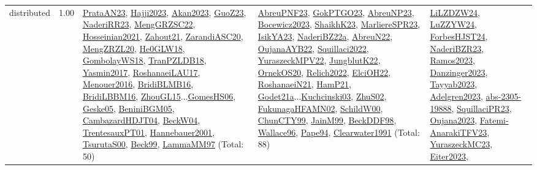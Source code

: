 {\begin{longtable}{p{3cm}r>{\raggedright\arraybackslash}p{6cm}>{\raggedright\arraybackslash}p{6cm}>{\raggedright\arraybackslash}p{8cm}}
\index{distributed}\index{Concepts!distributed}distributed &  1.00 & \hyperref[detail:PrataAN23]{PrataAN23}, \hyperref[detail:Hajji2023]{Hajji2023}, \hyperref[detail:Akan2023]{Akan2023}, \hyperref[detail:GuoZ23]{GuoZ23}, \hyperref[detail:NaderiRR23]{NaderiRR23}, \hyperref[detail:MengGRZSC22]{MengGRZSC22}, \hyperref[detail:Hosseinian2021]{Hosseinian2021}, \hyperref[detail:Zahout21]{Zahout21}, \hyperref[detail:ZarandiASC20]{ZarandiASC20}, \hyperref[detail:MengZRZL20]{MengZRZL20}, \hyperref[detail:He0GLW18]{He0GLW18}, \hyperref[detail:GombolayWS18]{GombolayWS18}, \hyperref[detail:TranPZLDB18]{TranPZLDB18}, \hyperref[detail:Yasmin2017]{Yasmin2017}, \hyperref[detail:RoshanaeiLAU17]{RoshanaeiLAU17}, \hyperref[detail:Menouer2016]{Menouer2016}, \hyperref[detail:BridiBLMB16]{BridiBLMB16}, \hyperref[detail:BridiLBBM16]{BridiLBBM16}, \hyperref[detail:ZhouGL15]{ZhouGL15}...\hyperref[detail:GomesHS06]{GomesHS06}, \hyperref[detail:Geske05]{Geske05}, \hyperref[detail:BeniniBGM05]{BeniniBGM05}, \hyperref[detail:CambazardHDJT04]{CambazardHDJT04}, \hyperref[detail:BeckW04]{BeckW04}, \hyperref[detail:TrentesauxPT01]{TrentesauxPT01}, \hyperref[detail:Hannebauer2001]{Hannebauer2001}, \hyperref[detail:TsurutaS00]{TsurutaS00}, \hyperref[detail:Beck99]{Beck99}, \hyperref[detail:LammaMM97]{LammaMM97} (Total: 50) & \hyperref[detail:AbreuPNF23]{AbreuPNF23}, \hyperref[detail:GokPTGO23]{GokPTGO23}, \hyperref[detail:AbreuNP23]{AbreuNP23}, \hyperref[detail:Bocewicz2023]{Bocewicz2023}, \hyperref[detail:ShaikhK23]{ShaikhK23}, \hyperref[detail:MarliereSPR23]{MarliereSPR23}, \hyperref[detail:IsikYA23]{IsikYA23}, \hyperref[detail:NaderiBZ22a]{NaderiBZ22a}, \hyperref[detail:AbreuN22]{AbreuN22}, \hyperref[detail:OujanaAYB22]{OujanaAYB22}, \hyperref[detail:Squillaci2022]{Squillaci2022}, \hyperref[detail:YuraszeckMPV22]{YuraszeckMPV22}, \hyperref[detail:JungblutK22]{JungblutK22}, \hyperref[detail:OrnekOS20]{OrnekOS20}, \hyperref[detail:Relich2022]{Relich2022}, \hyperref[detail:ElciOH22]{ElciOH22}, \hyperref[detail:RoshanaeiN21]{RoshanaeiN21}, \hyperref[detail:HamP21]{HamP21}, \hyperref[detail:Godet21a]{Godet21a}...\hyperref[detail:Kuchcinski03]{Kuchcinski03}, \hyperref[detail:ZhuS02]{ZhuS02}, \hyperref[detail:FukunagaHFAMN02]{FukunagaHFAMN02}, \hyperref[detail:SchildW00]{SchildW00}, \hyperref[detail:ChunCTY99]{ChunCTY99}, \hyperref[detail:JainM99]{JainM99}, \hyperref[detail:BeckDDF98]{BeckDDF98}, \hyperref[detail:Wallace96]{Wallace96}, \hyperref[detail:Pape94]{Pape94}, \hyperref[detail:Clearwater1991]{Clearwater1991} (Total: 88) & \hyperref[detail:LiLZDZW24]{LiLZDZW24}, \hyperref[detail:LuZZYW24]{LuZZYW24}, \hyperref[detail:ForbesHJST24]{ForbesHJST24}, \hyperref[detail:NaderiBZR23]{NaderiBZR23}, \hyperref[detail:Ramos2023]{Ramos2023}, \hyperref[detail:Danzinger2023]{Danzinger2023}, \hyperref[detail:Tayyab2023]{Tayyab2023}, \hyperref[detail:Adelgren2023]{Adelgren2023}, \hyperref[detail:abs-2305-19888]{abs-2305-19888}, \hyperref[detail:SquillaciPR23]{SquillaciPR23}, \hyperref[detail:Oujana2023]{Oujana2023}, \hyperref[detail:Fatemi-AnarakiTFV23]{Fatemi-AnarakiTFV23}, \hyperref[detail:YuraszeckMC23]{YuraszeckMC23}, \hyperref[detail:Eiter2023]{Eiter2023}, 
\end{longtable}}
